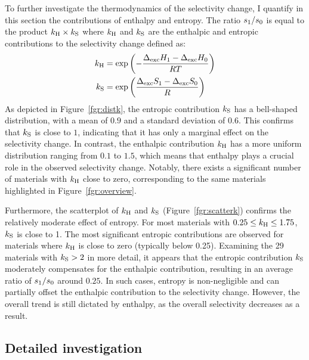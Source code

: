\documentclass[main.tex]{subfiles}
\begin{document}
To further investigate the thermodynamics of the selectivity change, I quantify in this section the contributions of enthalpy and entropy. The ratio ${s_{\text{1}}}/{s_{\text{0}}}$ is equal to the product $k_{\text{H}} \times k_{\text{S}}$ where $k_{\text{H}}$ and $k_{\text{S}}$ are the enthalpic and entropic contributions to the selectivity change defined as:
\begin{equation}
\label{eq:effects}
    \begin{split}
      k_{\text{H}} & = \exp\left(-\dfrac{\Delta_{\text{exc}}H_{\text{1}}-\Delta_{\text{exc}}H_{\text{0}}}{RT}\right) \\ k_{\text{S}} & = \exp\left(\dfrac{\Delta_{\text{exc}}S_{\text{1}}-\Delta_{\text{exc}}S_{\text{0}}}{R}\right)
    \end{split}
\end{equation}
As depicted in Figure~\ref{fgr:distk}, the entropic contribution $k_{\text{S}}$ has a bell-shaped distribution, with a mean of $0.9$ and a standard deviation of $0.6$. This confirms that $k_{\text{S}}$ is close to $1$, indicating that it has only a marginal effect on the selectivity change. In contrast, the enthalpic contribution $k_{\text{H}}$ has a more uniform distribution ranging from $0.1$ to $1.5$, which means that enthalpy plays a crucial role in the observed selectivity change. Notably, there exists a significant number of materials with $k_{\text{H}}$ close to zero, corresponding to the same materials highlighted in Figure~\ref{fgr:overview}.

Furthermore, the scatterplot of $k_{\text{H}}$ and $k_{\text{S}}$ (Figure~\ref{fgr:scatterk}) confirms the relatively moderate effect of entropy. For most materials with $0.25 \le k_{\text{H}} \le 1.75$, $k_{\text{S}}$ is close to 1. The most significant entropic contributions are observed for materials where $k_{\text{H}}$ is close to zero (typically below 0.25). Examining the 29 materials with $k_{\text{S}}>2$ in more detail, it appears that the entropic contribution $k_{\text{S}}$ moderately compensates for the enthalpic contribution, resulting in an average ratio of $s_{\text{1}}/s_{\text{0}}$ around $0.25$. In such cases, entropy is non-negligible and can partially offset the enthalpic contribution to the selectivity change. However, the overall trend is still dictated by enthalpy, as the overall selectivity decreases as a result.
  
\subsection{Detailed investigation}\label{sec:archetypes}
\end{document}
